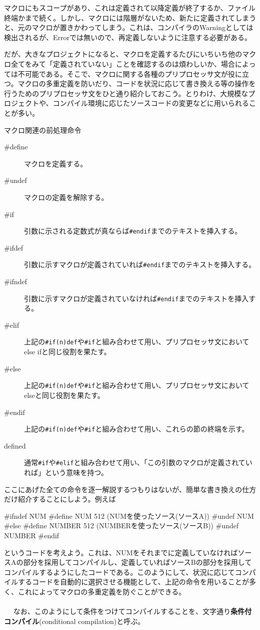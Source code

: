 マクロにもスコープがあり、これは定義されて以降定義が終了するか、ファイル終端かまで続く。しかし、マクロには階層がないため、新たに定義されてしまうと、元のマクロが置きかわってしまう。これは、コンパイラのWarningとしては検出されるが、Errorでは無いので、再定義しないように注意する必要がある。

だが、大きなプロジェクトになると、マクロを定義するたびにいちいち他のマクロ全てをみて「定義されていない」ことを確認するのは煩わしいか、場合によっては不可能である。そこで、マクロに関する各種のプリプロセッサ文が役に立つ。マクロの多重定義を防いだり、コードを状況に応じて書き換える等の操作を行うためのプリプロセッサ文をひと通り紹介しておこう。とりわけ、大規模なプロジェクトや、コンパイル環境に応じたソースコードの変更などに用いられることが多い。
\begin{itembox}[l]{マクロ関連の前処理命令}
\begin{description}
\item[\#define] マクロを定義する。
\item[\#undef] マクロの定義を解除する。
\item[\#if] 引数に示される定数式が真ならば\verb|#endif|までのテキストを挿入する。
\item[\#ifdef] 引数に示すマクロが定義されていれば\verb|#endif|までのテキストを挿入する。
\item[\#ifndef] 引数に示すマクロが定義されていなければ\verb|#endif|までのテキストを挿入する。
\item[\#elif] 上記の\verb|#if(n)def|や\verb|#if|と組み合わせて用い、プリプロセッサ文においてelse ifと同じ役割を果たす。
\item[\#else] 上記の\verb|#if(n)def|や\verb|#if|と組み合わせて用い、プリプロセッサ文においてelseと同じ役割を果たす。
\item[\#endif] 上記の\verb|#if(n)def|や\verb|#if|と組み合わせて用い、これらの節の終端を示す。
\item[defined] 通常\verb|#if|や\verb|#elif|と組み合わせて用い、「この引数のマクロが定義されていれば」という意味を持つ。
\end{description}
\end{itembox}

ここにあげた全ての命令を逐一解説するつもりはないが、簡単な書き換えの仕方だけ紹介することにしよう。例えば
\begin{code}
#ifndef NUM
  #define NUM 512
    (NUMを使ったソース(ソースA))
  #undef NUM
#else
  #define NUMBER 512
    (NUMBERを使ったソース(ソースB))
  #undef NUMBER
#endif
\end{code}
というコードを考えよう。これは、NUMをそれまでに定義していなければソースAの部分を採用してコンパイルし、定義していればソースBの部分を採用してコンパイルするようにしたコードである。このようにして、状況に応じてコンパイルするコードを自動的に選択させる機能として、上記の命令を用いることが多く、これによってマクロの多重定義を防ぐことができる。
\\ \\　
なお、このようにして条件をつけてコンパイルすることを、文字通り\textbf{条件付コンパイル}(conditional compilation)と呼ぶ。

